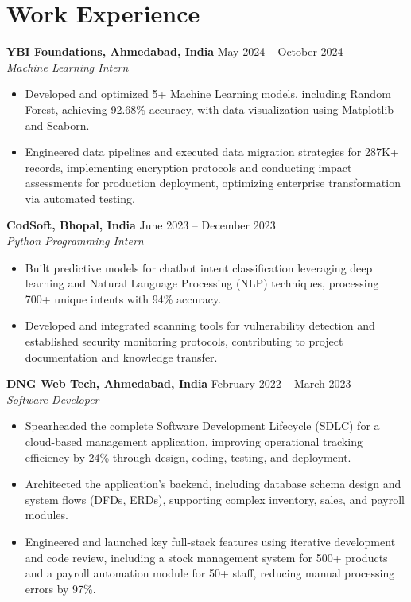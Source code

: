 \documentclass[a4paper,10pt]{article}
\begin{document}
\section*{Work Experience}
\textbf{YBI Foundations, Ahmedabad, India} \hfill May 2024 -- October 2024\\
\textit{Machine Learning Intern} \\
\begin{itemize}[leftmargin=*, itemsep=0pt, parsep=1pt]
\vspace{-6mm}
\item Developed and optimized 5+ Machine Learning models, including Random Forest, achieving 92.68\% accuracy, with data visualization using Matplotlib and Seaborn.
\item Engineered data pipelines and executed data migration strategies for 287K+ records, implementing encryption protocols and conducting impact assessments for production deployment, optimizing enterprise transformation via automated testing.
\end{itemize}
\textbf{CodSoft, Bhopal, India} \hfill June 2023 -- December 2023\\
\textit{Python Programming Intern} \\
\begin{itemize}[leftmargin=*, itemsep=0pt, parsep=1pt]
\vspace{-6mm}
\item Built predictive models for chatbot intent classification leveraging deep learning and Natural Language Processing (NLP) techniques, processing 700+ unique intents with 94\% accuracy.
\item Developed and integrated scanning tools for vulnerability detection and established security monitoring protocols, contributing to project documentation and knowledge transfer.
\vspace{-1mm}
\end{itemize}

\textbf{DNG Web Tech, Ahmedabad, India} \hfill February 2022 -- March 2023 \\
\textit{Software Developer} \\

\begin{itemize}[leftmargin=*, itemsep=0pt, parsep=1pt] %
\vspace{-7mm}
    \item Spearheaded the complete Software Development Lifecycle (SDLC) for a cloud-based management application, improving operational tracking efficiency by 24\% through design, coding, testing, and deployment.
\item Architected the application's backend, including database schema design and system flows (DFDs, ERDs), supporting complex inventory, sales, and payroll modules.
\item Engineered and launched key full-stack features using iterative development and code review, including a stock management system for 500+ products and a payroll automation module for 50+ staff, reducing manual processing errors by 97\%. 

\end{itemize}
\end{document}
